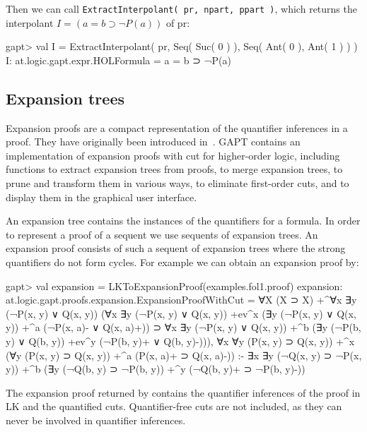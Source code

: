 \documentclass[a4paper,11pt]{article}
\newcommand{\impl}{\supset} %
\renewcommand{\lnot}{\neg}
\newcommand{\cli}[1]{{\ttfamily {#1}}}
\begin{document}
Then we can call \texttt{ExtractInterpolant( pr, npart, ppart )}, which returns the interpolant $I = (a=b \impl \lnot P(a))$ of pr:
\begin{clilisting}
gapt> val I = ExtractInterpolant( pr, Seq( Suc( 0 ) ), Seq( Ant( 0 ), Ant( 1 ) ) )
I: at.logic.gapt.expr.HOLFormula = a = b ⊃ ¬P(a)

\end{clilisting}

\subsection{Expansion trees}

Expansion proofs are a compact representation of the quantifier inferences in a
proof.  They have originally been introduced in~\cite{Miller87Compact}.  GAPT
contains an implementation of expansion proofs with cut for higher-order logic,
including functions to extract expansion trees from proofs, to merge expansion
trees, to prune and transform them in various ways, to eliminate first-order
cuts, and to display them in the graphical user interface.

An expansion tree contains the instances of the quantifiers for a formula.  In order
to represent a proof of a sequent we use sequents of expansion trees.  An
expansion proof consists of such a sequent of expansion trees where the
strong quantifiers do not form cycles.
For example we can obtain an expansion proof by:
\begin{clilisting}
gapt> val expansion = LKToExpansionProof(examples.fol1.proof)
expansion: at.logic.gapt.proofs.expansion.ExpansionProofWithCut =
∀X (X ⊃ X)
  +^{∀x ∃y (¬P(x, y) ∨ Q(x, y))}
    (∀x ∃y (¬P(x, y) ∨ Q(x, y)) +ev^{x}
        (∃y (¬P(x, y) ∨ Q(x, y)) +^{a} (¬P(x, a)- ∨ Q(x, a)+)) ⊃
      ∀x ∃y (¬P(x, y) ∨ Q(x, y))
        +^{b} (∃y (¬P(b, y) ∨ Q(b, y)) +ev^{y} (¬P(b, y)+ ∨ Q(b, y)-))),
∀x ∀y (P(x, y) ⊃ Q(x, y))
  +^{x} (∀y (P(x, y) ⊃ Q(x, y)) +^{a} (P(x, a)+ ⊃ Q(x, a)-))
:-
∃x ∃y (¬Q(x, y) ⊃ ¬P(x, y))
  +^{b} (∃y (¬Q(b, y) ⊃ ¬P(b, y)) +^{y} (¬Q(b, y)+ ⊃ ¬P(b, y)-))

\end{clilisting}

The expansion proof returned by \cli{LKToExpansionProof} contains the
quantifier inferences of the proof in LK and the quantified cuts.
Quantifier-free cuts are not included, as they can never be involved in
quantifier inferences.
\end{document}
